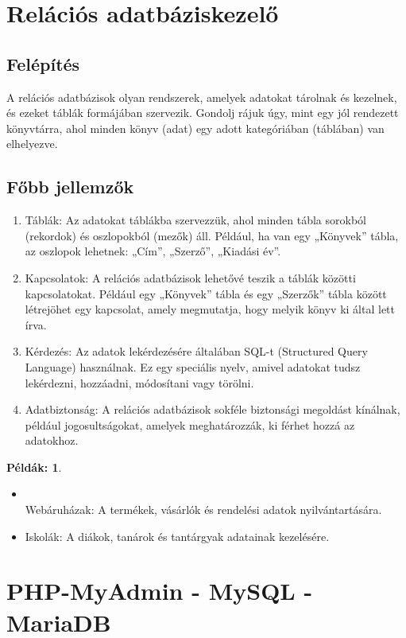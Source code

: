 \documentclass[colorlinks]{thesis-kando}
\theoremstyle{definition}
\newtheorem{peldak}{Példák:}
\theoremstyle{remark}
\begin{document}
\section{Relációs adatbáziskezelő}

\subsection{Felépítés}
A relációs adatbázisok olyan rendszerek, amelyek adatokat tárolnak és kezelnek, és ezeket táblák formájában szervezik. Gondolj rájuk úgy, mint egy jól rendezett könyvtárra, ahol minden könyv (adat) egy adott kategóriában (táblában) van elhelyezve.
\subsection{Főbb jellemzők}

\begin{enumerate}
    \item Táblák: Az adatokat táblákba szervezzük, ahol minden tábla sorokból (rekordok) és oszlopokból (mezők) áll. Például, ha van egy „Könyvek” tábla, az oszlopok lehetnek: „Cím”, „Szerző”, „Kiadási év”.
    \item Kapcsolatok: A relációs adatbázisok lehetővé teszik a táblák közötti kapcsolatokat. Például egy „Könyvek” tábla és egy „Szerzők” tábla között létrejöhet egy kapcsolat, amely megmutatja, hogy melyik könyv ki által lett írva.
    \item Kérdezés: Az adatok lekérdezésére általában SQL-t (Structured Query Language) használnak. Ez egy speciális nyelv, amivel adatokat tudsz lekérdezni, hozzáadni, módosítani vagy törölni.
    \item Adatbiztonság: A relációs adatbázisok sokféle biztonsági megoldást kínálnak, például jogosultságokat, amelyek meghatározzák, ki férhet hozzá az adatokhoz.
\end{enumerate}
\begin{peldak}
    \begin{itemize}
        \item \mbox{} \\ Webáruházak: A termékek, vásárlók és rendelési adatok nyilvántartására.
        \item Iskolák: A diákok, tanárok és tantárgyak adatainak kezelésére.
    \end{itemize}
\end{peldak}

\section{PHP-MyAdmin - MySQL - MariaDB}
\end{document}
